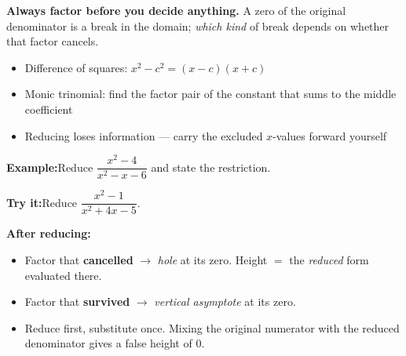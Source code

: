 \documentclass[12pt]{article}
\begin{document}


\begin{formulabox}
\textbf{Always factor before you decide anything.} A zero of the original denominator
is a break in the domain; \emph{which kind} of break depends on whether that factor
cancels.
\begin{itemize}[leftmargin=0.8cm, itemsep=0pt, topsep=1pt]
  \item Difference of squares: $x^2 - c^2 = (x-c)(x+c)$
  \item Monic trinomial: find the factor pair of the constant that sums to the middle coefficient
  \item Reducing loses information --- carry the excluded $x$-values forward yourself
\end{itemize}
\end{formulabox}

\begin{examplebox}
\textbf{Example:}\quad Reduce $\dfrac{x^2-4}{x^2-x-6}$ and state the restriction.
\end{examplebox}

\begin{tryitbox}
\textbf{Try it:}\quad Reduce $\dfrac{x^2-1}{x^2+4x-5}$.\\[2pt]
\end{tryitbox}


\begin{formulabox}
\textbf{After reducing:}
\begin{itemize}[leftmargin=0.8cm, itemsep=0pt, topsep=1pt]
  \item Factor that \textbf{cancelled} $\rightarrow$ \emph{hole} at its zero. Height $=$ the \emph{reduced} form evaluated there.
  \item Factor that \textbf{survived} $\rightarrow$ \emph{vertical asymptote} at its zero.
  \item Reduce first, substitute once. Mixing the original numerator with the reduced denominator gives a false height of $0$.
\end{itemize}
\end{formulabox}
\end{document}
